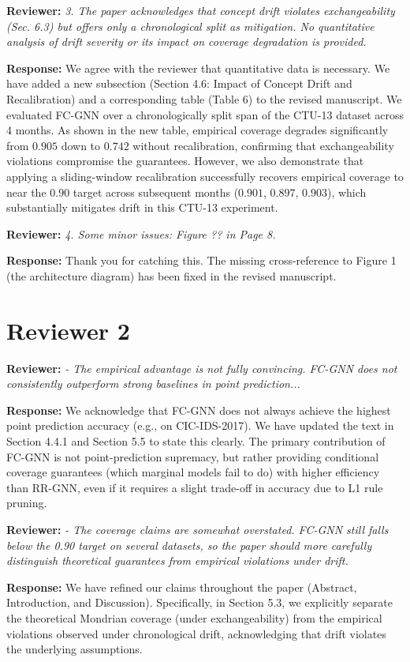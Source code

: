 \documentclass[11pt]{article}
\newcommand{\reviewer}[1]{\vspace{1em}\noindent\textbf{Reviewer: }\textit{#1}\vspace{0.5em}}
\newcommand{\response}[1]{\noindent\textbf{Response: }#1}
\begin{document}
\reviewer{3. The paper acknowledges that concept drift violates exchangeability (Sec. 6.3) but offers only a chronological split as mitigation. No quantitative analysis of drift severity or its impact on coverage degradation is provided.}

\response{We agree with the reviewer that quantitative data is necessary. We have added a new subsection (Section 4.6: Impact of Concept Drift and Recalibration) and a corresponding table (Table 6) to the revised manuscript. We evaluated FC-GNN over a chronologically split span of the CTU-13 dataset across 4 months. As shown in the new table, empirical coverage degrades significantly from $0.905$ down to $0.742$ without recalibration, confirming that exchangeability violations compromise the guarantees. However, we also demonstrate that applying a sliding-window recalibration successfully recovers empirical coverage to near the $0.90$ target across subsequent months ($0.901$, $0.897$, $0.903$), which substantially mitigates drift in this CTU-13 experiment.}

\reviewer{4. Some minor issues: Figure ?? in Page 8.}

\response{Thank you for catching this. The missing cross-reference to Figure 1 (the architecture diagram) has been fixed in the revised manuscript.}

\section*{Reviewer 2}

\reviewer{- The empirical advantage is not fully convincing. FC-GNN does not consistently outperform strong baselines in point prediction...}

\response{We acknowledge that FC-GNN does not always achieve the highest point prediction accuracy (e.g., on CIC-IDS-2017). We have updated the text in Section 4.4.1 and Section 5.5 to state this clearly. The primary contribution of FC-GNN is not point-prediction supremacy, but rather providing conditional coverage guarantees (which marginal models fail to do) with higher efficiency than RR-GNN, even if it requires a slight trade-off in accuracy due to L1 rule pruning.}

\reviewer{- The coverage claims are somewhat overstated. FC-GNN still falls below the 0.90 target on several datasets, so the paper should more carefully distinguish theoretical guarantees from empirical violations under drift.}

\response{We have refined our claims throughout the paper (Abstract, Introduction, and Discussion). Specifically, in Section 5.3, we explicitly separate the theoretical Mondrian coverage (under exchangeability) from the empirical violations observed under chronological drift, acknowledging that drift violates the underlying assumptions.}
\end{document}
